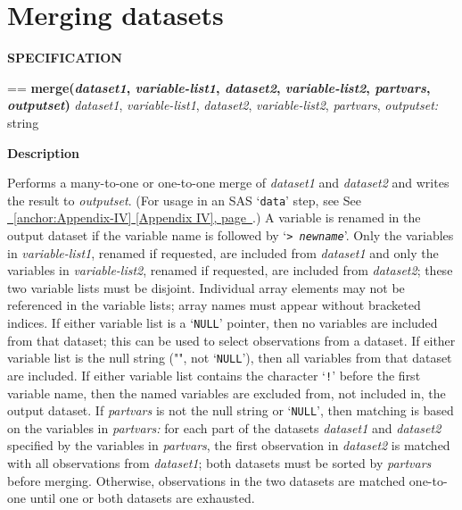 \documentclass{book}
\makeatletter
\newcommand\Texinfocommandstyletextvar[1]{{\normalfont{}\textsl{#1}}}%
\newenvironment{Texinfopreformatted}{%
  \par\GNUTobeylines\obeyspaces\frenchspacing\parskip=\z@\parindent=\z@}{}
{\catcode`\^^M=13 \gdef\GNUTobeylines{\catcode`\^^M=13 \def^^M{\null\par}}}
\newenvironment{Texinfoindented}{\begin{list}{}{}\item\relax}{\end{list}}
\renewcommand{\_}{\Texinfounderscore\discretionary{}{}{}}
\makeatother
\begin{document}
\section{{Merging datasets}}
\label{anchor:Merging-datasets}%

\noindent{}\textbf{SPECIFICATION}
\begin{Texinfoindented}
\begin{Texinfopreformatted}%
\textbf{merge(\Texinfocommandstyletextvar{dataset1}, \Texinfocommandstyletextvar{variable-list1}, \Texinfocommandstyletextvar{dataset2}, \Texinfocommandstyletextvar{variable-list2}, \Texinfocommandstyletextvar{partvars}, \Texinfocommandstyletextvar{outputset})}
\Texinfocommandstyletextvar{dataset1}, \Texinfocommandstyletextvar{variable-list1}, \Texinfocommandstyletextvar{dataset2}, \Texinfocommandstyletextvar{variable-list2}, \Texinfocommandstyletextvar{partvars}, \Texinfocommandstyletextvar{outputset:} string
\end{Texinfopreformatted}
\end{Texinfoindented}
%
%

\noindent{}\textbf{Description}

Performs a many-to-one or one-to-one merge of
\Texinfocommandstyletextvar{dataset1} and \Texinfocommandstyletextvar{dataset2} and writes the result to \Texinfocommandstyletextvar{outputset}.
(For usage in an SAS `\texttt{data}' step, see See \hyperref[anchor:Appendix-IV]{\chaptername~\ref*{anchor:Appendix-IV} [Appendix IV], page~\pageref*{anchor:Appendix-IV}}.)
A variable is renamed in the output dataset if the variable name is followed by
`\texttt{> \Texinfocommandstyletextvar{newname}}'.
Only the variables in \Texinfocommandstyletextvar{variable-list1}, renamed if requested,
are included from \Texinfocommandstyletextvar{dataset1}
and only the variables in \Texinfocommandstyletextvar{variable-list2}, renamed if requested,
are included from \Texinfocommandstyletextvar{dataset2};
these two variable lists must be disjoint.
Individual array elements may not be referenced in the variable lists; array
names must appear without bracketed indices.
If either variable list is a `\texttt{NULL}'
pointer, then no variables are included from
that dataset; this can be used to select observations
from a dataset.
If either variable list is the null string ("", not `\texttt{NULL}'),
then all variables from that dataset are included.
If either variable list contains the character `\texttt{!}' before the first
variable name, then the named variables are excluded from, not included in,
the output dataset.
If \Texinfocommandstyletextvar{partvars} is not the null string or `\texttt{NULL}', then
matching is based on the variables in \Texinfocommandstyletextvar{partvars:}
for each part of the datasets \Texinfocommandstyletextvar{dataset1} and \Texinfocommandstyletextvar{dataset2}
specified by the variables in \Texinfocommandstyletextvar{partvars},
the first observation in \Texinfocommandstyletextvar{dataset2}
is matched with all observations from \Texinfocommandstyletextvar{dataset1};
both datasets must be sorted by \Texinfocommandstyletextvar{partvars} before merging.
Otherwise, observations in the two datasets are matched one-to-one
until one or both datasets are exhausted.
\end{document}
